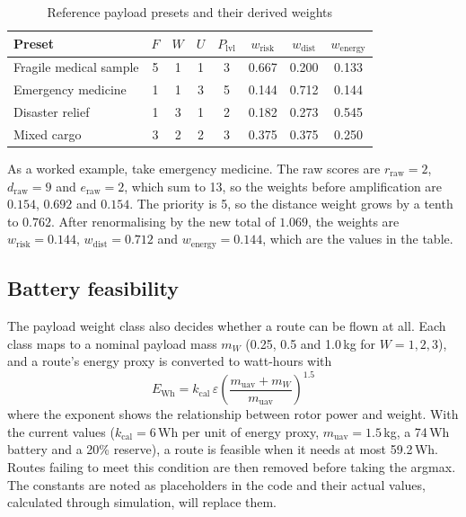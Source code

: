 \begin{table}[!htbp]
\centering
\caption{Reference payload presets and their derived weights}\label{tab:presets}
\small
\begin{tabular}{|l|c|c|c|c|c|c|c|}
\hline
\textbf{Preset} & $F$ & $W$ & $U$ & $P_\mathrm{lvl}$ & $w_\mathrm{risk}$ & $w_\mathrm{dist}$ & $w_\mathrm{energy}$\\
\hline
Fragile medical sample & 5 & 1 & 1 & 3 & 0.667 & 0.200 & 0.133\\
\hline
Emergency medicine & 1 & 1 & 3 & 5 & 0.144 & 0.712 & 0.144\\
\hline
Disaster relief & 1 & 3 & 1 & 2 & 0.182 & 0.273 & 0.545\\
\hline
Mixed cargo & 3 & 2 & 2 & 3 & 0.375 & 0.375 & 0.250\\
\hline
\end{tabular}
\end{table}

As a worked example, take emergency medicine. The raw scores are $r_\mathrm{raw} = 2$,
$d_\mathrm{raw} = 9$ and $e_\mathrm{raw} = 2$, which sum to 13, so the weights before
amplification are $0.154$, $0.692$ and $0.154$. The priority is 5, so the distance
weight grows by a tenth to $0.762$. After renormalising by the new total of $1.069$, the
weights are $w_\mathrm{risk} = 0.144$, $w_\mathrm{dist} = 0.712$ and
$w_\mathrm{energy} = 0.144$, which are the values in the table.

\subsection{Battery feasibility}

The payload weight class also decides whether a route can be flown at all. Each class
maps to a nominal payload mass $m_W$ (0.25, 0.5 and 1.0\,kg for $W = 1, 2, 3$), and a
route's energy proxy is converted to watt-hours with
\begin{equation}
  E_\mathrm{Wh} = k_\mathrm{cal}\,\varepsilon\left(\frac{m_\mathrm{uav} + m_W}{m_\mathrm{uav}}\right)^{1.5} \label{eq:battery}
\end{equation}
where the exponent shows the relationship between rotor power and weight. With the
current values ($k_\mathrm{cal} = 6$\,Wh per unit of energy proxy,
$m_\mathrm{uav} = 1.5$\,kg, a 74\,Wh battery and a 20\% reserve), a route is feasible
when it needs at most 59.2\,Wh. Routes failing to meet this condition are then removed
before taking the argmax. The constants are noted as placeholders in the code and their
actual values, calculated through simulation, will replace them.

